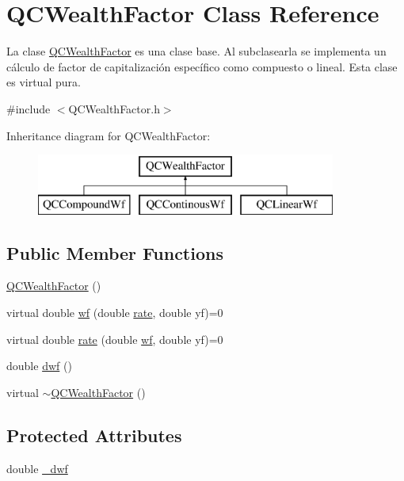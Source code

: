 \hypertarget{class_q_c_wealth_factor}{\section{Q\+C\+Wealth\+Factor Class Reference}
\label{class_q_c_wealth_factor}
}


La clase \hyperlink{class_q_c_wealth_factor}{Q\+C\+Wealth\+Factor} es una clase base. Al subclasearla se implementa un cálculo de factor de capitalización específico como compuesto o lineal. Esta clase es virtual pura.  




{\ttfamily \#include $<$Q\+C\+Wealth\+Factor.\+h$>$}

Inheritance diagram for Q\+C\+Wealth\+Factor\+:\begin{figure}[H]
\begin{center}
\leavevmode
\includegraphics[height=2.000000cm]{class_q_c_wealth_factor}
\end{center}
\end{figure}
\subsection*{Public Member Functions}
\begin{DoxyCompactItemize}
\item 
\hyperlink{class_q_c_wealth_factor_ae2963649c5562d4a05db49825bf1bb15}{Q\+C\+Wealth\+Factor} ()
\item 
virtual double \hyperlink{class_q_c_wealth_factor_a63ddc9c957aa438c1278b541f6e1ebbe}{wf} (double \hyperlink{class_q_c_wealth_factor_aad4a3d84f0c2073162cc5fcce5509d1c}{rate}, double yf)=0
\item 
virtual double \hyperlink{class_q_c_wealth_factor_aad4a3d84f0c2073162cc5fcce5509d1c}{rate} (double \hyperlink{class_q_c_wealth_factor_a63ddc9c957aa438c1278b541f6e1ebbe}{wf}, double yf)=0
\item 
double \hyperlink{class_q_c_wealth_factor_a16a17fd769e2f7945aa1e7925d3f9ace}{dwf} ()
\item 
virtual \hyperlink{class_q_c_wealth_factor_a6ea119054c89d5adb318711ff9452113}{$\sim$\+Q\+C\+Wealth\+Factor} ()
\end{DoxyCompactItemize}
\subsection*{Protected Attributes}
\begin{DoxyCompactItemize}
\item 
double \hyperlink{class_q_c_wealth_factor_ae8552209cdb2f98cd7c3f5011ffe5208}{\+\_\+dwf}
\end{DoxyCompactItemize}


